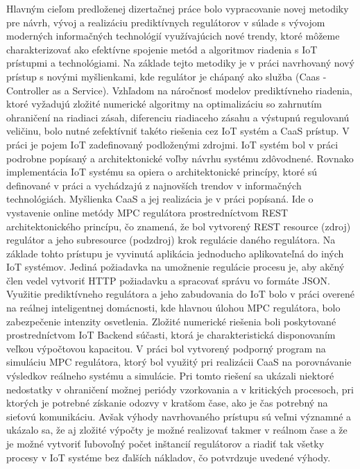 Hlavným cieľom predloženej dizertačnej práce bolo vypracovanie novej metodiky pre návrh, vývoj a realizáciu prediktívnych regulátorov v súlade s vývojom moderných informačných technológií využívajúcich nové trendy, ktoré môžeme charakterizovať ako efektívne spojenie metód a algoritmov riadenia s IoT prístupmi a technológiami. Na základe tejto metodiky je v práci navrhovaný nový prístup s novými myšlienkami, kde regulátor je chápaný ako služba (Caas - Controller as a Service). Vzhľadom na náročnosť modelov prediktívneho riadenia, ktoré vyžadujú zložité numerické algoritmy na optimalizáciu so zahrnutím ohraničení na riadiaci zásah, diferenciu riadiaceho zásahu a výstupnú regulovanú veličinu, bolo nutné zefektívniť takéto riešenia cez IoT systém a CaaS prístup. V práci je pojem IoT zadefinovaný podloženými zdrojmi. IoT systém bol v práci podrobne popísaný a architektonické voľby návrhu systému zdôvodnené. Rovnako implementácia IoT systému sa opiera o architektonické princípy, ktoré sú definované v práci a vychádzajú z najnovších trendov v informačných technológiách. Myšlienka CaaS a jej realizácia je v práci popísaná. Ide o vystavenie online metódy MPC regulátora prostredníctvom REST architektonického princípu, čo znamená, že bol vytvorený REST resource (zdroj) regulátor a jeho subresource (podzdroj) krok regulácie daného regulátora. Na základe tohto prístupu je vyvinutá aplikácia jednoducho aplikovateľná do iných IoT systémov. Jediná požiadavka na umožnenie regulácie procesu je, aby akčný člen vedel vytvoriť HTTP požiadavku a spracovať správu vo formáte JSON. Využitie prediktívneho regulátora a jeho zabudovania do IoT bolo v práci overené na reálnej inteligentnej domácnosti, kde hlavnou úlohou MPC regulátora, bolo zabezpečenie intenzity osvetlenia. Zložité numerické riešenia boli poskytované prostredníctvom IoT Backend súčasti, ktorá je charakteristická disponovaním veľkou výpočtovou kapacitou. V práci bol vytvorený podporný program na simuláciu MPC regulátora, ktorý bol využitý pri realizácii CaaS na porovnávanie výsledkov reálneho systému a simulácie. Pri tomto riešení sa ukázali niektoré nedostatky v ohraničení možnej periódy vzorkovania a v kritických procesoch, pri ktorých je potrebné získanie odozvy v kratšom čase, ako je čas potrebný na sieťovú komunikáciu. Avšak výhody navrhovaného prístupu sú veľmi významné a ukázalo sa, že aj zložité výpočty je možné realizovať takmer v reálnom čase a že je možné vytvoriť ľubovoľný počet inštancií regulátorov a riadiť tak všetky procesy v IoT systéme bez ďalších nákladov, čo potvrdzuje uvedené výhody.
